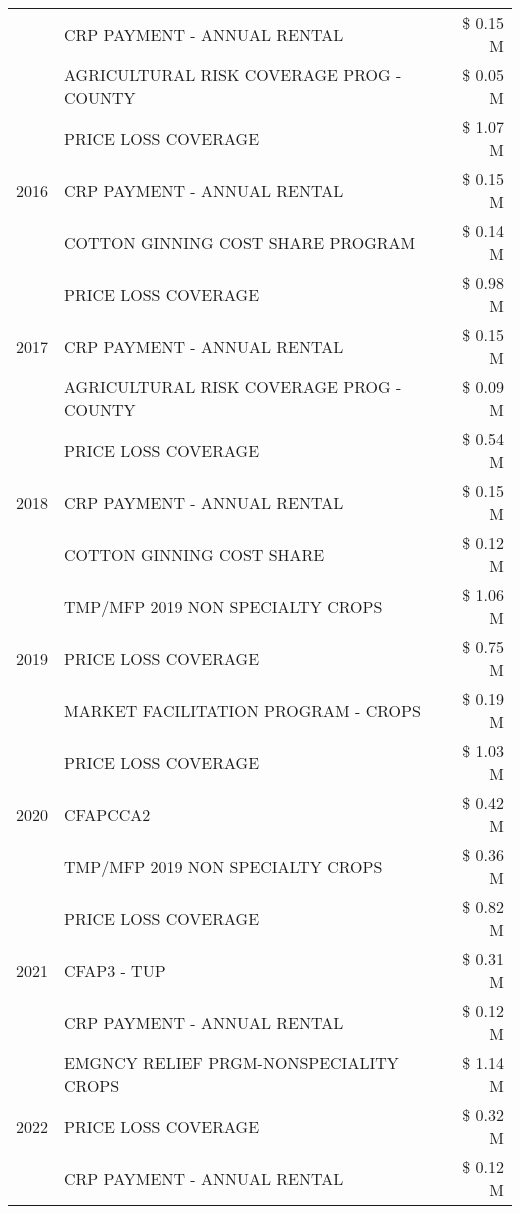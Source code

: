\begin{tabular}{llr}
 & CRP PAYMENT - ANNUAL RENTAL & \$ 0.15 M \\
 & AGRICULTURAL RISK COVERAGE PROG - COUNTY & \$ 0.05 M \\
\cline{1-3}
\multirow[t]{3}{*}{2016} & PRICE LOSS COVERAGE & \$ 1.07 M \\
 & CRP PAYMENT - ANNUAL RENTAL & \$ 0.15 M \\
 & COTTON GINNING COST SHARE PROGRAM & \$ 0.14 M \\
\cline{1-3}
\multirow[t]{3}{*}{2017} & PRICE LOSS COVERAGE & \$ 0.98 M \\
 & CRP PAYMENT - ANNUAL RENTAL & \$ 0.15 M \\
 & AGRICULTURAL RISK COVERAGE PROG - COUNTY & \$ 0.09 M \\
\cline{1-3}
\multirow[t]{3}{*}{2018} & PRICE LOSS COVERAGE & \$ 0.54 M \\
 & CRP PAYMENT - ANNUAL RENTAL & \$ 0.15 M \\
 & COTTON GINNING COST SHARE & \$ 0.12 M \\
\cline{1-3}
\multirow[t]{3}{*}{2019} & TMP/MFP 2019 NON SPECIALTY CROPS & \$ 1.06 M \\
 & PRICE LOSS COVERAGE & \$ 0.75 M \\
 & MARKET FACILITATION PROGRAM - CROPS & \$ 0.19 M \\
\cline{1-3}
\multirow[t]{3}{*}{2020} & PRICE LOSS COVERAGE & \$ 1.03 M \\
 & CFAPCCA2 & \$ 0.42 M \\
 & TMP/MFP 2019 NON SPECIALTY CROPS & \$ 0.36 M \\
\cline{1-3}
\multirow[t]{3}{*}{2021} & PRICE LOSS COVERAGE & \$ 0.82 M \\
 & CFAP3 - TUP & \$ 0.31 M \\
 & CRP PAYMENT - ANNUAL RENTAL & \$ 0.12 M \\
\cline{1-3}
\multirow[t]{3}{*}{2022} & EMGNCY RELIEF PRGM-NONSPECIALITY CROPS & \$ 1.14 M \\
 & PRICE LOSS COVERAGE & \$ 0.32 M \\
 & CRP PAYMENT - ANNUAL RENTAL & \$ 0.12 M \\
\cline{1-3}
\bottomrule
\end{tabular}
